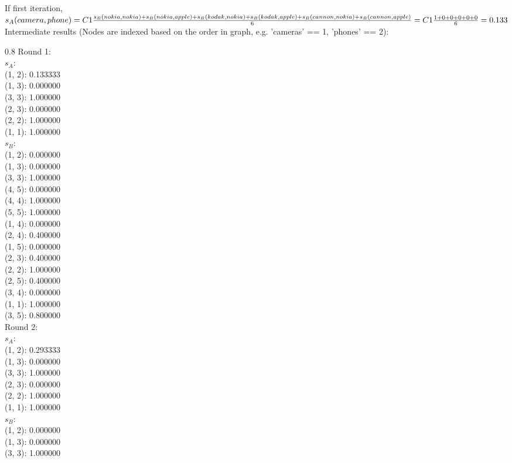 \documentclass{article}
\newenvironment{myenv}[1]
  {\begin{spacing}{#1}}
  {\end{spacing}}
\begin{document}
If first iteration, $s_A(camera, phone) = \\ C1\frac{s_B(nokia, nokia) +  s_B(nokia, apple) + s_B(kodak, nokia) + s_B(kodak, apple) + s_B(cannon, nokia) + s_B(cannon, apple)}{6} = \\ C1\frac{1 + 0 + 0 + 0 + 0 + 0}{6} = 0.133$ \\
Intermediate results (Nodes are indexed based on the order in graph, e.g. 'cameras' == 1, 'phones' == 2): \\
\begin{myenv}{0.8}
Round 1:\\ 
$s_A$:\\
(1, 2): 0.133333 \\
(1, 3): 0.000000 \\
(3, 3): 1.000000 \\
(2, 3): 0.000000 \\
(2, 2): 1.000000 \\
(1, 1): 1.000000 \\
$s_B$:\\
(1, 2): 0.000000 \\
(1, 3): 0.000000 \\
(3, 3): 1.000000 \\
(4, 5): 0.000000 \\
(4, 4): 1.000000 \\
(5, 5): 1.000000 \\
(1, 4): 0.000000 \\
(2, 4): 0.400000 \\
(1, 5): 0.000000 \\
(2, 3): 0.400000 \\
(2, 2): 1.000000 \\
(2, 5): 0.400000 \\
(3, 4): 0.000000 \\
(1, 1): 1.000000 \\
(3, 5): 0.800000 \\
Round 2:\\ 
$s_A$:\\
(1, 2): 0.293333 \\
(1, 3): 0.000000 \\
(3, 3): 1.000000 \\
(2, 3): 0.000000 \\
(2, 2): 1.000000 \\
(1, 1): 1.000000 \\
$s_B$:\\
(1, 2): 0.000000 \\
(1, 3): 0.000000 \\
(3, 3): 1.000000 \\

\end{myenv}
\end{document}
